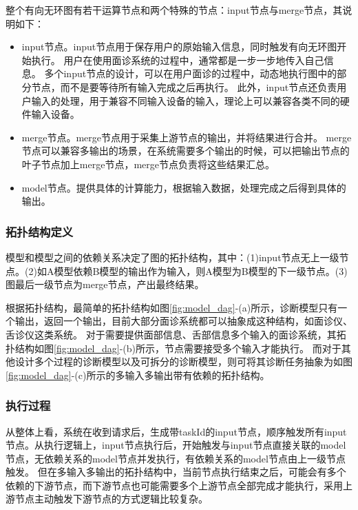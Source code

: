 整个有向无环图有若干运算节点和两个特殊的节点：input节点与merge节点，其说明如下：
\begin{itemize}
    \item input节点。input节点用于保存用户的原始输入信息，同时触发有向无环图开始执行。
    用户在使用面诊系统的过程中，通常都是一步一步地传入自己信息。
    多个input节点的设计，可以在用户面诊的过程中，动态地执行图中的部分节点，而不是要等待所有输入完成之后再执行。
    此外，input节点还负责用户输入的处理，用于兼容不同输入设备的输入，理论上可以兼容各类不同的硬件输入设备。

    \item merge节点。merge节点用于采集上游节点的输出，并将结果进行合并。
    merge节点可以兼容多输出的场景，在系统需要多个输出的时候，可以把输出节点的叶子节点加上merge节点，merge节点负责将这些结果汇总。

    \item model节点。提供具体的计算能力，根据输入数据，处理完成之后得到具体的输出。
\end{itemize}

\subsubsection{拓扑结构定义}
模型和模型之间的依赖关系决定了图的拓扑结构，其中：(1)input节点无上一级节点。(2)如A模型依赖B模型的输出作为输入，则A模型为B模型的下一级节点。(3)图最后一级节点为merge节点，产出最终结果。

根据拓扑结构，最简单的拓扑结构如图\ref{fig:model_dag}-(a)所示，诊断模型只有一个输出，返回一个输出，目前大部分面诊系统都可以抽象成这种结构，如面诊仪、舌诊仪这类系统。
对于需要提供面部信息、舌部信息多个输入的面诊系统，其拓扑结构如图\ref{fig:model_dag}-(b)所示，节点需要接受多个输入才能执行。
而对于其他设计多个过程的诊断模型以及可拆分的诊断模型，则可将其诊断任务抽象为如图\ref{fig:model_dag}-(c)所示的多输入多输出带有依赖的拓扑结构。

\subsubsection{执行过程}

从整体上看，系统在收到请求后，生成带taskId的input节点，顺序触发所有input节点。从执行逻辑上，input节点执行后，开始触发与input节点直接关联的model节点，无依赖关系的model节点并发执行，有依赖关系的model节点由上一级节点触发。
但在多输入多输出的拓扑结构中，当前节点执行结束之后，可能会有多个依赖的下游节点，而下游节点也可能需要多个上游节点全部完成才能执行，采用上游节点主动触发下游节点的方式逻辑比较复杂。

